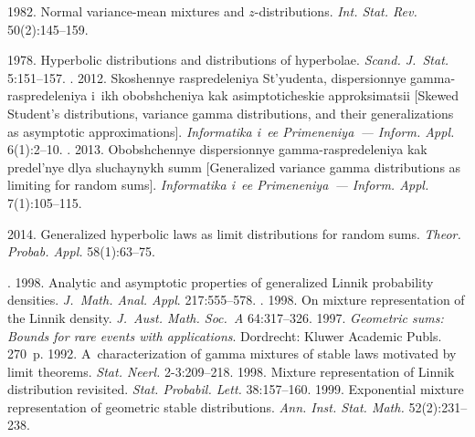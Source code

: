 \begin{multicols}{2}
{{\begin{thebibliography}{99}
1982. Normal variance-mean mixtures and \mbox{$z$-distributions}. 
\textit{Int. Stat. Rev.} 50(2):145--159. 

\pagebreak

 1978. Hyperbolic distributions and distributions 
of hyperbolae. \textit{Scand. J.~Stat.} 5:151--157. 
. 2012. Skoshennye raspredeleniya 
St'yudenta, dispersionnye gamma-raspredeleniya i~ikh obobshcheniya kak asimptoticheskie 
approksimatsii [Skewed Student's distributions, variance gamma distributions, 
and their generalizations as asymptotic approximations]. 
\textit{Informatika i~ee Primeneniya~--- Inform. Appl.} 6(1):2--10. 
. 2013. Obobshchennye dispersionnye 
gamma-raspredeleniya kak predel'nye dlya sluchaynykh summ 
[Generalized variance gamma distributions as limiting for random sums]. 
\textit{Informatika i~ee Primeneniya~--- Inform. Appl.} 7(1):105--115. 

 2014. Generalized hyperbolic laws as limit
distributions for random sums. \textit{Theor. Probab. Appl.} 58(1):63--75.


. 
1998. Analytic and asymptotic properties of generalized Linnik probability densities. 
\textit{J.~Math. Anal. Appl}. 217:555--578.  
. 1998. 
On mixture representation of the Linnik density.
\textit{J.~Aust. Math. Soc.~A} 64:317--326. 
 1997. \textit{Geometric sums: Bounds for rare events with 
applications}. Dordrecht: Kluwer Academic Publs. 270~p.
 1992. A~characterization of gamma mixtures of stable 
laws motivated by limit theorems. \textit{Stat. Neerl.} 2-3:209--218. 
 1998. Mixture representation of Linnik distribution revisited.
\textit{Stat. Probabil. Lett.} 38:157--160. 
 1999. Exponential mixture representation of geometric 
stable distributions. \textit{Ann. Inst. Stat. Math.}
52(2):231--238. 
\end{thebibliography}

 }
 }

\end{multicols}


